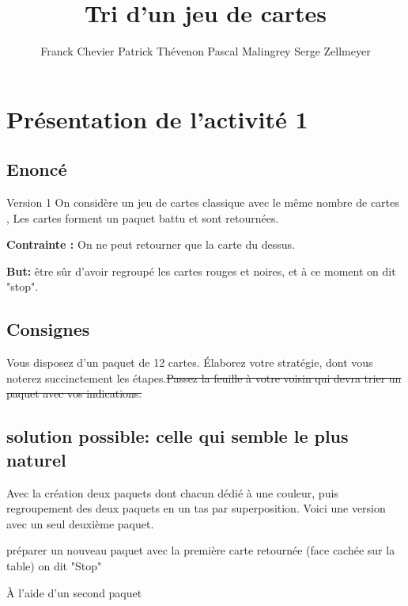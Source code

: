 \documentclass[10pt,french]{article}
\title{Tri d'un jeu de cartes}
\author{Franck Chevier Patrick Thévenon Pascal Malingrey Serge Zellmeyer}
\date{}
\theoremstyle{plain}
\begin{document}

\tableofcontents

\section{Présentation de l'activité 1}



\subsection{Enoncé}
\begin{bclogo}[arrondi = 0,logo = \bcetoile]{Version 1}
    On considère un jeu de cartes classique avec le même nombre de cartes , Les cartes forment un paquet battu et sont retournées.
    
    \textbf{Contrainte :}
    On ne peut retourner que la carte du dessus.
    
    \textbf{But: }
    être sûr d'avoir regroupé les cartes rouges et noires, et à ce moment on dit "stop".
\end{bclogo}

  \subsection{Consignes}
  Vous disposez d'un paquet de 12 cartes. Élaborez votre stratégie, dont vous noterez succinctement les étapes.\sout{Passez la feuille à votre voisin qui devra trier un paquet avec vos indications.}
  
  \subsection{solution possible: celle qui semble le plus naturel}
  
 Avec la création deux paquets dont chacun dédié à une couleur, puis regroupement des deux paquets en un tas par superposition.
 Voici une version avec un seul deuxième paquet.
  
  \begin{algorithm}[H]
     \SetAlgoLined
     préparer un nouveau paquet avec la première carte retournée (face cachée sur la table) \;
   on dit "Stop" \;
     \caption{À l'aide d'un second paquet}
  \end{algorithm}
  
\end{document}
